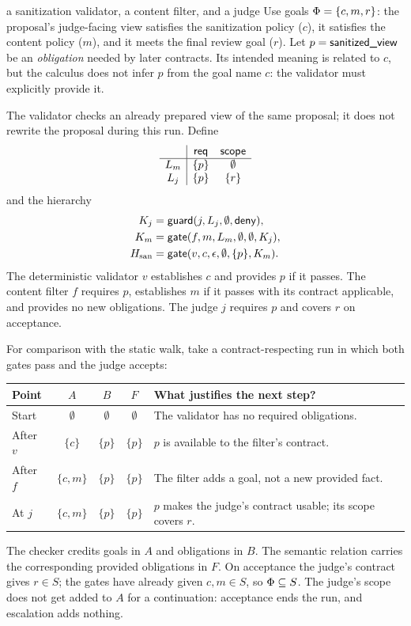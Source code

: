 \begin{example}{a sanitization validator, a content filter, and a judge}
Use goals $\Phi=\{c,m,r\}$: the proposal's judge-facing view satisfies the sanitization policy ($c$), it satisfies the content policy ($m$), and it meets the final review goal ($r$). Let $p=\textsf{sanitized\_view}$ be an \emph{obligation} needed by later contracts. Its intended meaning is related to $c$, but the calculus does not infer $p$ from the goal name $c$: the validator must explicitly provide it.

The validator checks an already prepared view of the same proposal; it does not rewrite the proposal during this run. Define
\[
\begin{array}{c|cc}
 & \mathsf{req} & \mathsf{scope}\\\hline
L_m & \{p\} & \emptyset\\
L_j & \{p\} & \{r\}
\end{array}
\]
and the hierarchy
\begin{align*}
K_j&=\mathsf{guard}(j,L_j,\emptyset,\mathsf{deny}),\\
K_m&=\mathsf{gate}(f,m,L_m,\emptyset,\emptyset,K_j),\\
H_{\mathrm{san}}&=\mathsf{gate}(v,c,\epsilon,\emptyset,\{p\},K_m).
\end{align*}
The deterministic validator $v$ establishes $c$ and provides $p$ if it passes. The content filter $f$ requires $p$, establishes $m$ if it passes with its contract applicable, and provides no new obligations. The judge $j$ requires $p$ and covers $r$ on acceptance.

For comparison with the static walk, take a contract-respecting run in which both gates pass and the judge accepts:
\begin{center}
\renewcommand{\arraystretch}{1.25}
\begin{tabularx}{\linewidth}{@{}lcccX@{}}
\toprule
\textbf{Point} & $A$ & $B$ & $F$ & \textbf{What justifies the next step?}\\
\midrule
Start & $\emptyset$ & $\emptyset$ & $\emptyset$ & The validator has no required obligations.\\
After $v$ & $\{c\}$ & $\{p\}$ & $\{p\}$ & $p$ is available to the filter's contract.\\
After $f$ & $\{c,m\}$ & $\{p\}$ & $\{p\}$ & The filter adds a goal, not a new provided fact.\\
At $j$ & $\{c,m\}$ & $\{p\}$ & $\{p\}$ & $p$ makes the judge's contract usable; its scope covers $r$.\\
\bottomrule
\end{tabularx}
\end{center}
The checker credits goals in $A$ and obligations in $B$. The semantic relation carries the corresponding provided obligations in $F$. On acceptance the judge's contract gives $r\in S$; the gates have already given $c,m\in S$, so $\Phi\subseteq S$. The judge's scope does not get added to $A$ for a continuation: acceptance ends the run, and escalation adds nothing.


\end{example}
